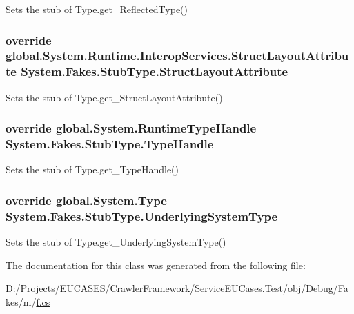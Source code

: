 Sets the stub of Type.\-get\-\_\-\-Reflected\-Type()

\hypertarget{class_system_1_1_fakes_1_1_stub_type_a25db891dd7813dd566346191730407d4}{
\subsubsection[{Struct\-Layout\-Attribute}]{\setlength{\rightskip}{0pt plus 5cm}override global.\-System.\-Runtime.\-Interop\-Services.\-Struct\-Layout\-Attribute System.\-Fakes.\-Stub\-Type.\-Struct\-Layout\-Attribute\hspace{0.3cm}{\ttfamily [get]}}}\label{class_system_1_1_fakes_1_1_stub_type_a25db891dd7813dd566346191730407d4}


Sets the stub of Type.\-get\-\_\-\-Struct\-Layout\-Attribute()

\hypertarget{class_system_1_1_fakes_1_1_stub_type_a1e7848f1b94c5d2161bdb90cff8fac22}{
\subsubsection[{Type\-Handle}]{\setlength{\rightskip}{0pt plus 5cm}override global.\-System.\-Runtime\-Type\-Handle System.\-Fakes.\-Stub\-Type.\-Type\-Handle\hspace{0.3cm}{\ttfamily [get]}}}\label{class_system_1_1_fakes_1_1_stub_type_a1e7848f1b94c5d2161bdb90cff8fac22}


Sets the stub of Type.\-get\-\_\-\-Type\-Handle()

\hypertarget{class_system_1_1_fakes_1_1_stub_type_ace3ac8f7aff53b5dbcb43f96c5feafca}{
\subsubsection[{Underlying\-System\-Type}]{\setlength{\rightskip}{0pt plus 5cm}override global.\-System.\-Type System.\-Fakes.\-Stub\-Type.\-Underlying\-System\-Type\hspace{0.3cm}{\ttfamily [get]}}}\label{class_system_1_1_fakes_1_1_stub_type_ace3ac8f7aff53b5dbcb43f96c5feafca}


Sets the stub of Type.\-get\-\_\-\-Underlying\-System\-Type()



The documentation for this class was generated from the following file\-:\begin{DoxyCompactItemize}
\item 
D\-:/\-Projects/\-E\-U\-C\-A\-S\-E\-S/\-Crawler\-Framework/\-Service\-E\-U\-Cases.\-Test/obj/\-Debug/\-Fakes/m/\hyperlink{m_2f_8cs}{f.\-cs}\end{DoxyCompactItemize}
